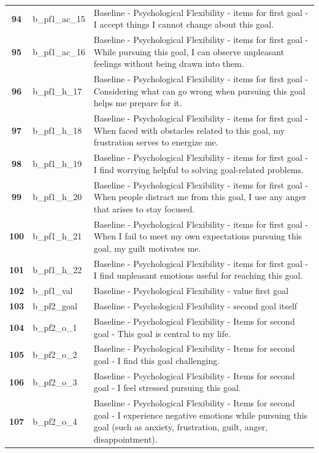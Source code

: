 \documentclass[
  letterpaper,
  DIV=11,
  numbers=noendperiod]{scrartcl}
\begin{document}
\begin{longtable}[t]{>{}cll}
\textbf{94} & b\_pf1\_ac\_15 & Baseline - Psychological Flexibility - items for first goal - I accept things I cannot change about this goal.\\
\textbf{95} & b\_pf1\_ac\_16 & Baseline - Psychological Flexibility - items for first goal - While pursuing this goal, I can observe unpleasant feelings without being drawn into them.\\
\addlinespace
\textbf{96} & b\_pf1\_h\_17 & Baseline - Psychological Flexibility - items for first goal - Considering what can go wrong when pursuing this goal helps me prepare for it.\\
\textbf{97} & b\_pf1\_h\_18 & Baseline - Psychological Flexibility - items for first goal - When faced with obstacles related to this goal, my frustration serves to energize me.\\
\textbf{98} & b\_pf1\_h\_19 & Baseline - Psychological Flexibility - items for first goal - I find worrying helpful to solving goal-related problems.\\
\textbf{99} & b\_pf1\_h\_20 & Baseline - Psychological Flexibility - items for first goal - When people distract me from this goal, I use any anger that arises to stay focused.\\
\textbf{100} & b\_pf1\_h\_21 & Baseline - Psychological Flexibility - items for first goal - When I fail to meet my own expectations pursuing this goal, my guilt motivates me.\\
\addlinespace
\textbf{101} & b\_pf1\_h\_22 & Baseline - Psychological Flexibility - items for first goal - I find unpleasant emotions useful for reaching this goal.\\
\textbf{102} & b\_pf1\_val & Baseline - Psychological Flexibility - value first goal\\
\textbf{103} & b\_pf2\_goal & Baseline - Psychological Flexibility - second goal itself\\
\textbf{104} & b\_pf2\_o\_1 & Baseline - Psychological Flexibility - Items for second goal - This goal is central to my life.\\
\textbf{105} & b\_pf2\_o\_2 & Baseline - Psychological Flexibility - Items for second goal - I find this goal challenging.\\
\addlinespace
\textbf{106} & b\_pf2\_o\_3 & Baseline - Psychological Flexibility - Items for second goal - I feel stressed pursuing this goal.\\
\textbf{107} & b\_pf2\_o\_4 & Baseline - Psychological Flexibility - Items for second goal - I experience negative emotions while pursuing this goal (such as anxiety, frustration, guilt, anger, disappointment).\\

\end{longtable}
\end{document}
